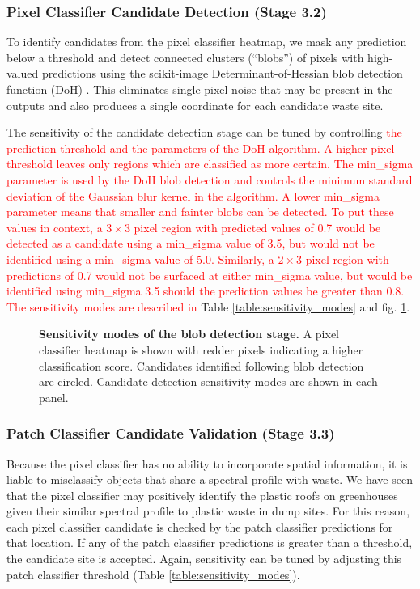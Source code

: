 \documentclass[10pt,letterpaper]{article}
\begin{document}
\subsubsection*{Pixel Classifier Candidate Detection (Stage 3.2)}
To identify candidates from the pixel classifier heatmap, we mask any prediction below a threshold and detect connected clusters (“blobs”) of pixels with high-valued predictions using the scikit-image Determinant-of-Hessian blob detection function (DoH) \cite{van2014scikit}. This eliminates single-pixel noise that may be present in the outputs and also produces a single coordinate for each candidate waste site. 

The sensitivity of the candidate detection stage can be tuned by controlling \textcolor{red}{the prediction threshold and the parameters of the DoH algorithm. A higher pixel threshold leaves only regions which are classified as more certain. The min\_sigma parameter is used by the DoH blob detection and controls the minimum standard deviation of the Gaussian blur kernel in the algorithm. A lower min\_sigma parameter means that smaller and fainter blobs can be detected. To put these values in context, a $3\times3$ pixel region with predicted values of 0.7 would be detected as a candidate using a min\_sigma value of 3.5, but would not be identified using a min\_sigma value of 5.0. Similarly, a $2\times3$ pixel region with predictions of 0.7 would not be surfaced at either min\_sigma value, but would be identified using min\_sigma 3.5 should the prediction values be greater than 0.8. The sensitivity modes are described in} Table \ref{table:sensitivity_modes} and fig. \ref{fig:blob_detection}.

\begin{figure}[!h]
    \caption{{\bf Sensitivity modes of the blob detection stage.}
    A pixel classifier heatmap is shown with redder pixels indicating a higher classification score. Candidates identified following blob detection are circled. Candidate detection sensitivity modes are shown in each panel.}
    \label{fig:blob_detection}
\end{figure}

\subsubsection*{Patch Classifier Candidate Validation (Stage 3.3)}
Because the pixel classifier has no ability to incorporate spatial information, it is liable to misclassify objects that share a spectral profile with waste. We have seen that the pixel classifier may positively identify the plastic roofs on greenhouses given their similar spectral profile to plastic waste in dump sites. For this reason, each pixel classifier candidate is checked by the patch classifier predictions for that location. If any of the patch classifier predictions is greater than a threshold, the candidate site is accepted. Again, sensitivity can be tuned by adjusting this patch classifier threshold (Table \ref{table:sensitivity_modes}).
\end{document}
